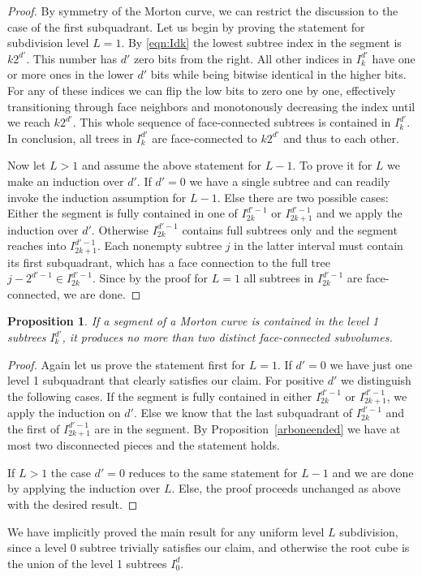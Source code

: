 \documentclass[a4paper,11pt]{article}
\newcommand{\Idk}{I^{d'}_k}
\newcommand{\Idmk}{I^{d'-1}_{2k}}
\newcommand{\Idmkp}{I^{d'-1}_{2k+1}}
\newcommand{\eqnref}[1]{\eqref{eqn:#1}}
\newtheorem{prop}[thm]{Proposition}
\begin{document}
\begin{proof}
  By symmetry of the Morton curve, we can restrict the discussion to the case
  of the first subquadrant.  Let us begin by proving the statement for
  subdivision level $L = 1$.  By \eqnref{Idk} the lowest subtree index in the
  segment is $k2^{d'}$.  This number has $d'$ zero bits from the right.  All
  other indices in $\Idk$ have one or more ones in the lower $d'$ bits while
  being bitwise identical in the higher bits.  For any of these indices we can
  flip the low bits to zero one by one, effectively transitioning through face
  neighbors and monotonously decreasing the index until we reach $k2^{d'}$.
  This whole sequence of face-connected subtrees is contained in $\Idk$.  In
  conclusion, all trees in $\Idk$ are face-connected to $k2^{d'}$ and thus to
  each other.

  Now let $L > 1$ and assume the above statement for $L - 1$.  To prove it for
  $L$ we make an induction over $d'$.  If $d' = 0$ we have a single subtree and
  can readily invoke the induction assumption for $L - 1$.  Else there are two
  possible cases: Either the segment is fully contained in one of $\Idmk$ or
  $\Idmkp$ and we apply the induction over $d'$.  Otherwise $\Idmk$ contains
  full subtrees only and the segment reaches into $\Idmkp$.  Each nonempty
  subtree $j$ in the latter interval must contain its first subquadrant, which
  has a face connection to the full tree $j - 2^{d'-1} \in \Idmk$.  Since by
  the proof for $L = 1$ all subtrees in $\Idmk$ are face-connected, we are
  done.
\end{proof}
\begin{prop}
  \label{arbtwoended}
  If a segment of a Morton curve is contained in the level 1 subtrees $\Idk$,
  it produces no more than two distinct face-connected subvolumes.
\end{prop}
\begin{proof}
  Again let us prove the statement first for $L = 1$.  If $d' = 0$ we have just
  one level 1 subquadrant that clearly satisfies our claim.  For positive
  $d'$ we distinguish the following cases.  If the segment is fully contained
  in either $\Idmk$ or $\Idmkp$, we apply the induction on $d'$.  Else we know
  that the last subquadrant of $\Idmk$ and the first of $\Idmkp$ are in the
  segment.  By Proposition~\ref{arboneended} we have at most two disconnected
  pieces and the statement holds.
  
  If $L > 1$ the case $d' = 0$ reduces to the same statement for $L - 1$ and we
  are done by applying the induction over $L$.  Else, the proof proceeds
  unchanged as above with the desired result.
\end{proof}
We have implicitly proved the main result for any uniform level $L$
subdivision, since a level 0 subtree trivially satisfies our claim, and
otherwise the root cube is the union of the level 1 subtrees $I^d_0$.
\end{document}
